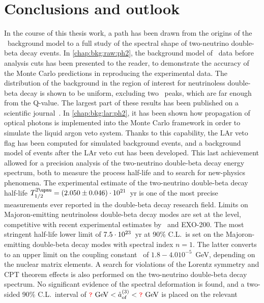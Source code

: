 
\chapter*{Conclusions and outlook}%
\label{chap:concl}

In the course of this thesis work, a path has been drawn from the origins of the \gerda\
background model to a full study of the spectral shape of two-neutrino double-beta decay
events. In \cref{chap:bkg:raw:ph2}, the background model of \gerdatwo\ data before
analysis cuts has been presented to the reader, to demonstrate the accuracy of the Monte
Carlo predictions in reproducing the experimental data. The distribution of the background
in the region of interest for neutrinoless double-beta decay is shown to be uniform,
excluding two \g\ peaks, which are far enough from the Q-value. The largest part of these
results has been published on a scientific journal~\cite{Agostini2019b}. In
\cref{chap:bkg:lar:ph2}, it has been shown how propagation of optical photons is
implemented into the Monte Carlo framework in order to simulate the liquid argon veto
system. Thanks to this capability, the LAr veto flag has been computed for simulated
background events, and a background model of events after the LAr veto cut has been
developed. This last achievement allowed for a precision analysis of the two-neutrino
double-beta decay energy spectrum, both to measure the process half-life and to search for
new-physics phenomena. The experimental estimate of the two-neutrino double-beta decay
half-life $\thalftwoM = \thalftwovalueshort$~yr is one of the most precise measurements
ever reported in the double-beta decay research field. Limits on Majoron-emitting
neutrinoless double-beta decay modes are set at the \powtenyr{23} level, competitive with
recent experimental estimates by \kamlandzen\ and EXO-200. The most stringent half-life
lower limit of $7.5 \cdot 10^{23}$~yr at 90\% C.L.~is set on the Majoron-emitting
double-beta decay modes with spectral index $n=1$. The latter converts to an upper limit
on the coupling constant \ga\ of $1.8{-}4.0 10^{-5}$~GeV, depending on the nuclear matrix
elements. A search for violations of the Lorentz symmetry and CPT theorem effects is also
performed on the two-neutrino double-beta decay spectrum.  No significant evidence of the
spectral deformation is found, and a two-sided 90\% C.L.~interval of
$\textcolor{red}{\texttt{?}}~\text{GeV} < {\mathring{a}_\text{of}^{(3)}} < \textcolor{red}{\texttt{?}}~\text{GeV}$ is placed on the relevant
